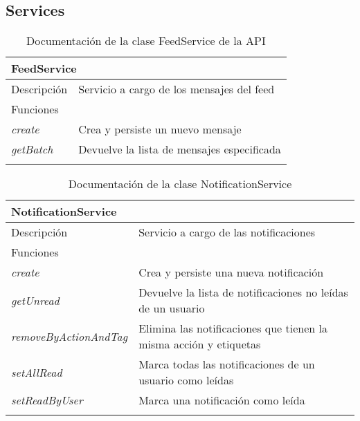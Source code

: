 \vspace{-25pt}
\subsection{Services}

\begin{longtable}{|p{} p{}|}
    \hline
    \multicolumn{2}{|l|}{\textbf{FeedService}} \\ \hline \hline
    Descripción      & Servicio a cargo de los mensajes del feed \\ \hline
    \multicolumn{2}{|l|}{Funciones} \\
    \emph{create}  & Crea y persiste un nuevo mensaje  \\
    \emph{getBatch}  & Devuelve la lista de mensajes especificada  \\ \hline
    \caption{Documentación de la clase FeedService de la API}
    \label{dis:api:feed_service}
\end{longtable}

\vspace{-15pt}
\begin{longtable}{|p{} p{}|}
    \hline
    \multicolumn{2}{|l|}{\textbf{NotificationService}} \\ \hline \hline
    Descripción      & Servicio a cargo de las notificaciones \\ \hline
    \multicolumn{2}{|l|}{Funciones} \\
    \emph{create}  & Crea y persiste una nueva notificación  \\
    \emph{getUnread}  & Devuelve la lista de notificaciones no leídas de un usuario  \\
    \emph{removeByActionAndTag}  & Elimina las notificaciones que tienen la misma acción y etiquetas  \\
    \emph{setAllRead}  & Marca todas las notificaciones de un usuario como leídas  \\
    \emph{setReadByUser}  & Marca una notificación como leída  \\ \hline
    \caption{Documentación de la clase NotificationService}
    \label{dis:api:notification_service}
\end{longtable}

